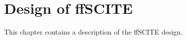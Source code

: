\chapter{Design of ffSCITE}

This chapter contains a description of the \ac{ffSCITE} design.







